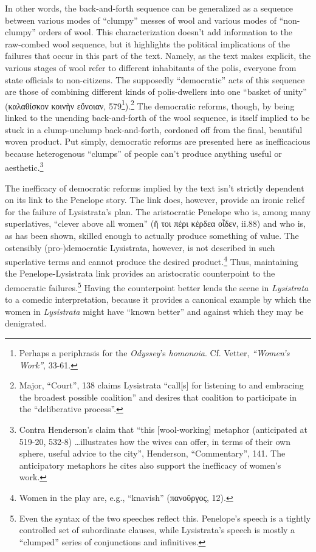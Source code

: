 \documentclass[12pt]{article}
\begin{document}
In other words, the back-and-forth sequence can be generalized as a sequence between various modes of ``clumpy'' messes of wool and various modes of ``non-clumpy'' orders of wool. This characterization doesn't add information to the raw-combed wool sequence, but it highlights the political implications of the failures that occur in this part of the text. Namely, as the text makes explicit, the various stages of wool refer to different inhabitants of the polis, everyone from state officials to non-citizens. The supposedly ``democratic'' acts of this sequence are those of combining different kinds of polis-dwellers into one ``basket of unity'' (καλαθίσκον κοινὴν εὔνοιαν, 579\footnote{Perhaps a periphrasis for the \textit{Odyssey}'s \textit{homonoia}. Cf. Vetter, \textit{``Women's Work''}, 33-61.}).\footnote{Major, ``Court'', 138 claims Lysistrata ``call[s] for listening to and embracing the broadest possible coalition'' and desires that coalition to participate in the ``deliberative process''.} The democratic reforms, though, by being linked to the unending back-and-forth of the wool sequence, is itself implied to be stuck in a clump-unclump back-and-forth, cordoned off from the final, beautiful woven product. Put simply, democratic reforms are presented here as inefficacious because heterogenous ``clumps'' of people can't produce anything useful or aesthetic.\footnote{Contra Henderson's claim that ``this [wool-working] metaphor (anticipated at 519-20, 532-8) \dots  illustrates how the wives can offer, in terms of their own sphere, useful advice to the city'', Henderson, ``Commentary'', 141. The anticipatory metaphors he cites also support the inefficacy of women's work.}

The inefficacy of democratic reforms implied by the text isn't strictly dependent on its link to the Penelope story. The link does, however, provide an ironic relief for the failure of Lysistrata's plan. The aristocratic Penelope who is, among many superlatives, ``clever above all women'' (ἥ τοι πέρι κέρδεα οἶδεν, ii.88) and who is, as has been shown, skilled enough to actually produce something of value. The ostensibly (pro-)democratic Lysistrata, however, is not described in such superlative terms and cannot produce the desired product.\footnote{Women in the play are, e.g., ``knavish'' (πανοῦργος, 12).} Thus, maintaining the Penelope-Lysistrata link provides an aristocratic counterpoint to the democratic failures.\footnote{Even the syntax of the two speeches reflect this. Penelope's speech is a tightly controlled set of subordinate clauses, while Lysistrata's speech is mostly a ``clumped'' series of conjunctions and infinitives.} Having the counterpoint better lends the scene in \textit{Lysistrata} to a comedic interpretation, because it provides a canonical example by which the women in \textit{Lysistrata} might have ``known better'' and against which they may be denigrated.
\end{document}
